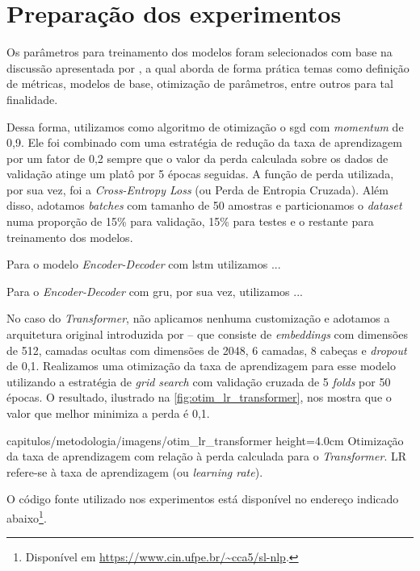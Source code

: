 \section{Preparação dos experimentos}
\label{sec:metodologia-preparacao-experimentos}

Os parâmetros para treinamento dos modelos foram selecionados com base na discussão apresentada por , a qual aborda de forma prática temas como definição de métricas, modelos de base, otimização de parâmetros, entre outros para tal finalidade.

Dessa forma, utilizamos como algoritmo de otimização o \acrfull{sgd} com \textit{momentum} de 0,9. Ele foi combinado com uma estratégia de redução da taxa de aprendizagem por um fator de 0,2 sempre que o valor da perda calculada sobre os dados de validação atinge um platô por 5 épocas seguidas. A função de perda utilizada, por sua vez, foi a \textit{Cross-Entropy Loss} (ou Perda de Entropia Cruzada). Além disso, adotamos \textit{batches} com tamanho de 50 amostras e particionamos o \textit{dataset} numa proporção de 15\% para validação, 15\% para testes e o restante para treinamento dos modelos.

Para o modelo \textit{Encoder-Decoder} com \acrshort{lstm} utilizamos ...

Para o \textit{Encoder-Decoder} com \acrshort{gru}, por sua vez, utilizamos ...

No caso do \textit{Transformer}, não aplicamos nenhuma customização e adotamos a arquitetura original introduzida por \cite{vaswani-2017-transformer} -- que consiste de \textit{embeddings} com dimensões de 512, camadas ocultas com dimensões de 2048, 6 camadas, 8 cabeças e \textit{dropout} de 0,1.
Realizamos uma otimização da taxa de aprendizagem para esse modelo utilizando a estratégia de \textit{grid search} com validação cruzada de 5 \textit{folds} por 50 épocas. O resultado, ilustrado na \autoref{fig:otim_lr_transformer}, nos mostra que o valor que melhor minimiza a perda é 0,1.

    {capitulos/metodologia/imagens/otim_lr_transformer}
    {height=4.0cm}
    {Otimização da taxa de aprendizagem com relação à perda calculada para o \textit{Transformer}. LR refere-se à taxa de aprendizagem (ou \textit{learning rate}).}
    {}


O código fonte utilizado nos experimentos está disponível no endereço indicado abaixo\footnote{
    Disponível em \url{https://www.cin.ufpe.br/~cca5/sl-nlp}.
}.




